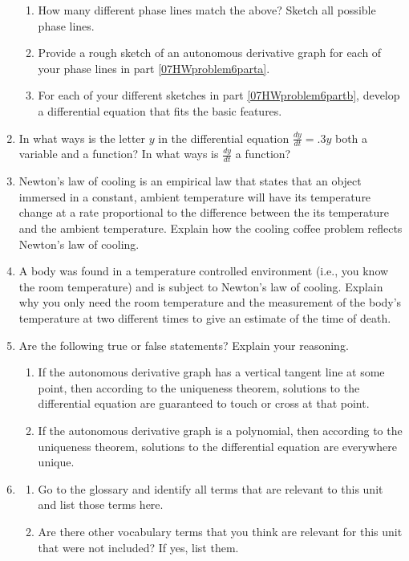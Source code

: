 \begin{enumerate}
\begin{enumerate}
\item	How many different phase lines match the above? Sketch all possible phase lines. \label{07HWproblem6parta}
\item	Provide a rough sketch of an autonomous derivative graph for each of your phase lines in part \ref{07HWproblem6parta}. \label{07HWproblem6partb}
\item	For each of your different sketches in part \ref{07HWproblem6partb}, develop a differential equation that fits the basic features. \label{07HWproblem6partc}
\end{enumerate}
\item  In what ways is the letter $y$ in the differential equation $\frac{dy}{dt} = .3y$ both a variable and a function? In what ways is $\frac{dy}{dt}$ a function? \label{07HWproblem7}
\item Newton's law of cooling is an empirical law that states that an object immersed in a constant, ambient temperature will have its temperature change at a rate proportional to the difference between the its temperature and the ambient temperature. Explain how the cooling coffee problem reflects Newton's law of cooling. \label{07HWproblem8}
\item A body was found in a temperature controlled environment (i.e., you know the room temperature) and is subject to Newton's law of cooling. Explain why you only need the room temperature and the measurement of the body's temperature at two different times to give an estimate of the time of death. \label{07HWproblem9}
\item Are the following true or false statements? Explain your reasoning. \label{07HWproblem10}
\begin{enumerate}
\item If the autonomous derivative graph has a vertical tangent line at some point, then according to the uniqueness theorem, solutions to the differential equation are guaranteed to touch or cross at that point.  
\item If the autonomous derivative graph is a polynomial, then according to the uniqueness theorem, solutions to the differential equation are everywhere unique.
\end{enumerate}
\item \label{07HWproblem11}
\begin{enumerate}
\item Go to the glossary and identify all terms that are relevant to this unit and list those terms here.
\item Are there other vocabulary terms that you think are relevant for this unit that were not included? If yes, list them.
\end{enumerate}

\end{enumerate}



